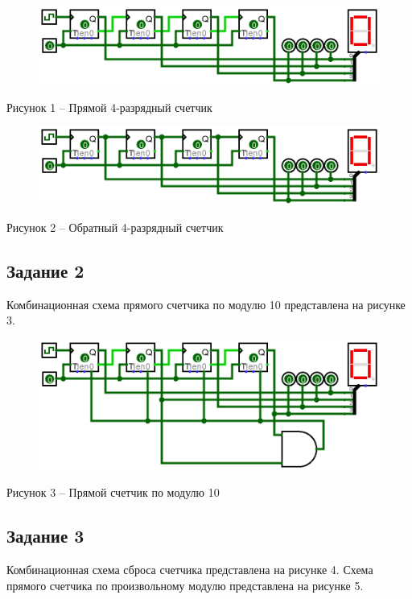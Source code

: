 \documentclass[a4paper,14pt]{extarticle}
\begin{document}
	\begin{figure}[h]
		\centering
		\includegraphics[width=0.8\linewidth]{images/s-1-1}
	\end{figure}
	\begin{center}
		Рисунок 1 – Прямой 4-разрядный счетчик
	\end{center}
	
	\begin{figure}[h]
		\centering
		\includegraphics[width=0.8\linewidth]{images/s-1-2}
	\end{figure}
	\begin{center}
		Рисунок 2 – Обратный 4-разрядный счетчик
	\end{center}
	
	\subsection*{Задание 2}
	Комбинационная схема прямого счетчика по модулю 10 представлена на рисунке 3.
	
	\begin{figure}[h]
		\centering
		\includegraphics[width=0.8\linewidth]{images/s-2}
	\end{figure}
	\begin{center}
		Рисунок 3 – Прямой счетчик по модулю 10
	\end{center}
	
	\subsection*{Задание 3}
	Комбинационная схема сброса счетчика представлена на рисунке 4. Схема прямого счетчика по произвольному модулю представлена на рисунке 5.
	
\end{document}

